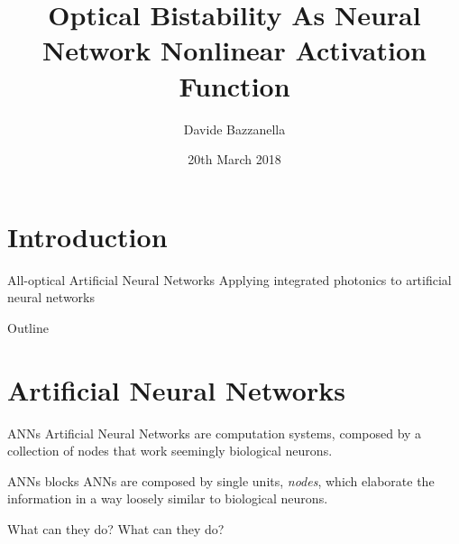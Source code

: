 \documentclass[11pt]{beamer}
\author[D. Bazzanella]{Davide Bazzanella}
\title[All-Optical Neural Networks]{Optical Bistability As Neural Network Nonlinear Activation Function}
\institute[UNITN]{Università degli studi di Trento}
\date{20th March 2018}
\begin{document}
\frame{\titlepage}
\section[Introduction]{Introduction}
\begin{frame}{All-optical Artificial Neural Networks}
	Applying integrated photonics to artificial neural networks
\end{frame}

\begin{frame}{Outline}
\tableofcontents[pausesections]
\end{frame}

\section{Artificial Neural Networks}
%
\begin{frame}{ANNs}
	Artificial Neural Networks are computation systems, composed by a collection of nodes that work seemingly biological neurons.
\end{frame}
%
\begin{frame}{ANNs blocks}
	ANNs are composed by single units, \textit{nodes}, which elaborate the information in a way loosely similar to biological neurons.
	\begin{figure}
		\centering
		
	\end{figure}
\end{frame}
%
\begin{frame}[c]{What can they do?}
	\center \huge What can they do?
\end{frame}
%
\end{document}

